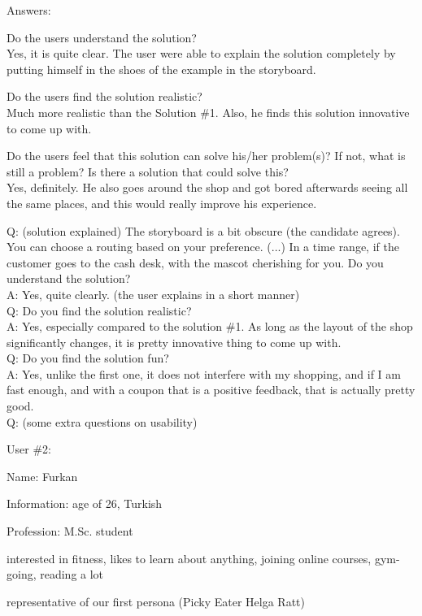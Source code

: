 \documentclass[a4paper,10pt,oneside]{scrreprt}
\begin{document}
Answers:
\begin{compactitem}
	\item Do the users understand the solution?\\
	Yes, it is quite clear. The user were able to explain the solution completely by putting himself in the shoes of the example in the storyboard.\\
	
	\item Do the users find the solution realistic?\\
	Much more realistic than the Solution \#1. Also, he finds this solution innovative to come up with.\\
	
	\item Do the users feel that this solution can solve his/her problem(s)? If not, what is still
	a problem? Is there a solution that could solve this?\\
	Yes, definitely. He also goes around the shop and got bored afterwards seeing all the same places, and this would really improve his experience.\\
\end{compactitem}
\bigskip

\noindent Q: (solution explained) The storyboard is a bit obscure (the candidate agrees). You can choose a routing based on your preference. (...) In a time range, if the customer goes to the cash desk, with the mascot cherishing for you. Do you understand the solution?\\
A: Yes, quite clearly. (the user explains in a short manner)\\
Q: Do you find the solution realistic?\\
A: Yes, especially compared to the solution \#1. As long as the layout of the shop significantly changes, it is pretty innovative thing to come up with.\\
Q: Do you find the solution fun?\\
A: Yes, unlike the first one, it does not interfere with my shopping, and if I am fast enough, and with a coupon that is a positive feedback, that is actually pretty good.\\
Q: (some extra questions on usability)


\bigskip
\bigskip

User \#2:
\begin{compactitem}
	\item Name: Furkan
	\item Information: age of 26, Turkish
	\item Profession: M.Sc. student
	\item interested in fitness, likes to learn about anything, joining online courses, gym-going, reading a lot
	\item representative of our first persona (Picky Eater Helga Ratt)
\end{compactitem}
\bigskip
\end{document}
